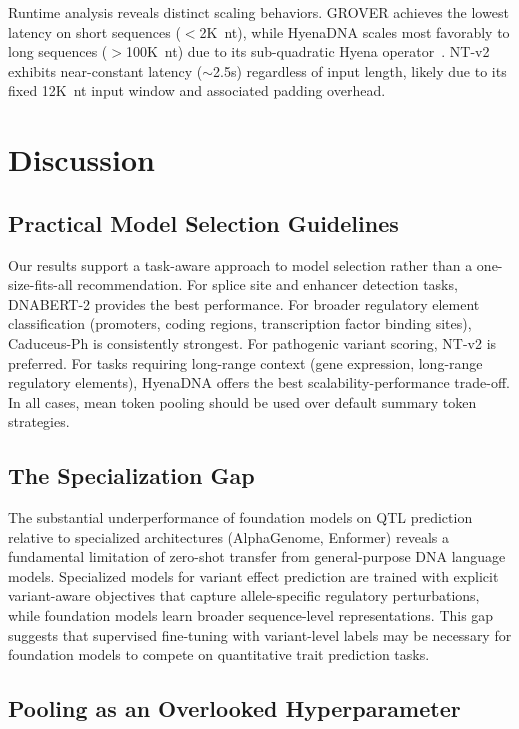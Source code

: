 \documentclass{article}
\begin{document}
Runtime analysis reveals distinct scaling behaviors. GROVER achieves the lowest
latency on short sequences ($<$2K~nt), while HyenaDNA scales most favorably
to long sequences ($>$100K~nt) due to its sub-quadratic Hyena
operator~\citep{dao_2022_flashattention}. NT-v2
exhibits near-constant latency ($\sim$2.5s) regardless of input length, likely
due to its fixed 12K~nt input window and associated padding overhead.

\section{Discussion}
\label{sec:discussion}

\subsection{Practical Model Selection Guidelines}

Our results support a task-aware approach to model selection rather than a
one-size-fits-all recommendation. For splice site and enhancer detection tasks,
DNABERT-2 provides the best performance. For broader regulatory element
classification (promoters, coding regions, transcription factor binding sites),
Caduceus-Ph is consistently strongest. For pathogenic variant scoring, NT-v2 is
preferred. For tasks requiring long-range context (gene expression, long-range
regulatory elements), HyenaDNA offers the best scalability-performance trade-off.
In all cases, mean token pooling should be used over default summary token
strategies.

\subsection{The Specialization Gap}

The substantial underperformance of foundation models on QTL prediction relative
to specialized architectures (AlphaGenome, Enformer) reveals a fundamental
limitation of zero-shot transfer from general-purpose DNA language models.
Specialized models for variant effect prediction are trained with explicit
variant-aware objectives that capture allele-specific regulatory perturbations,
while foundation models learn broader sequence-level representations. This gap
suggests that supervised fine-tuning with variant-level labels may be necessary
for foundation models to compete on quantitative trait prediction tasks.

\subsection{Pooling as an Overlooked Hyperparameter}
\end{document}
